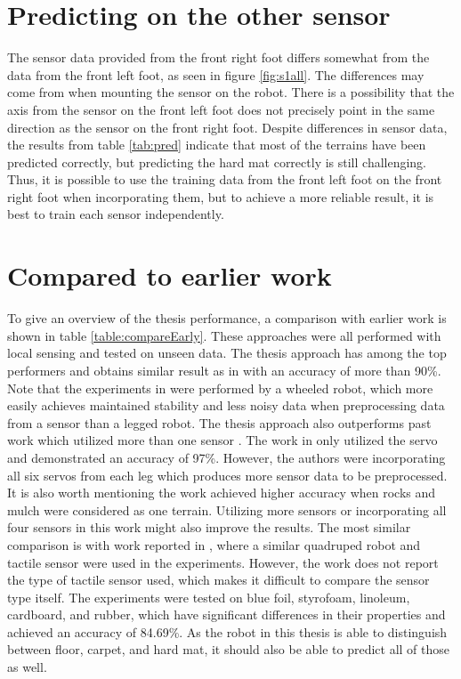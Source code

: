 \documentclass[USenglish]{ifimaster}  %
\begin{document}
\section{Predicting on the other sensor}
The sensor data provided from the front right foot differs somewhat from the data from the front left foot, as seen in figure \ref{fig:s1all}. The differences may come from when mounting the sensor on the robot. There is a possibility that the axis from the sensor on the front left foot does not precisely point in the same direction as the sensor on the front right foot. Despite differences in sensor data, the results from table \ref{tab:pred} indicate that most of the terrains have been predicted correctly, but predicting the hard mat correctly is still challenging. Thus, it is possible to use the training data from the front left foot on the front right foot when incorporating them, but to achieve a more reliable result, it is best to train each sensor independently.


\section{Compared to earlier work}
To give an overview of the thesis performance, a comparison with earlier work is shown in table \ref{table:compareEarly}. These approaches were all performed with local sensing and tested on unseen data. The thesis approach has among the top performers and obtains similar result as in \cite{5752869,4059113,5602459,26b23e912c654fe4b7478fd910130195} with an accuracy of more than 90\%. Note that the experiments in \cite{5752869,4059113} were performed by a wheeled robot, which more easily achieves maintained stability and less noisy data when preprocessing data from a sensor than a legged robot. The thesis approach also outperforms past work which utilized more than one sensor \cite{6849778,6386243}. The work in \cite{26b23e912c654fe4b7478fd910130195} only utilized the servo and demonstrated an accuracy of 97\%. However, the authors were incorporating all six servos from each leg which produces more sensor data to be preprocessed. It is also worth mentioning the work achieved higher accuracy when rocks and mulch were considered as one terrain. Utilizing more sensors or incorporating all four sensors in this work might also improve the results. The most similar comparison is with work reported in \cite{6784609}, where a similar quadruped robot and tactile sensor were used in the experiments. However, the work does not report the type of tactile sensor used, which makes it difficult to compare the sensor type itself. The experiments were tested on blue foil, styrofoam, linoleum, cardboard, and rubber, which have significant differences in their properties and achieved an accuracy of 84.69\%. As the robot in this thesis is able to distinguish between floor, carpet, and hard mat, it should also be able to predict all of those as well.
\end{document}
